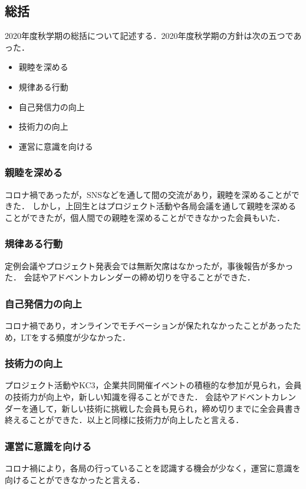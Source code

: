 \subsection*{\firstGrade{}総括}


2020年度秋学期の\firstGrade{}総括について記述する．2020年度秋学期の\firstGrade{}方針は次の五つであった．
\begin{itemize}
	\item 親睦を深める
	\item 規律ある行動
	\item 自己発信力の向上
	\item 技術力の向上
	\item 運営に意識を向ける
\end{itemize}

\subsubsection*{親睦を深める}
コロナ禍であったが，SNSなどを通して\firstGrade{}間の交流があり，親睦を深めることができた．
しかし，上回生とはプロジェクト活動や各局会議を通して親睦を深めることができたが，個人間での親睦を深めることができなかった会員もいた．

\subsubsection*{規律ある行動}
定例会議やプロジェクト発表会では無断欠席はなかったが，事後報告が多かった．
会誌やアドベントカレンダーの締め切りを守ることができた．

\subsubsection*{自己発信力の向上}
コロナ禍であり，オンラインでモチベーションが保たれなかったことがあったため，LTをする頻度が少なかった．

\subsubsection*{技術力の向上}
プロジェクト活動やKC3，企業共同開催イベントの積極的な参加が見られ，\firstGrade{}会員の技術力が向上や，新しい知識を得ることができた．
会誌やアドベントカレンダーを通して，新しい技術に挑戦した会員も見られ，締め切りまでに全会員書き終えることができた．以上と同様に技術力が向上したと言える．

\subsubsection*{運営に意識を向ける}
コロナ禍により，各局の行っていることを認識する機会が少なく，運営に意識を向けることができなかったと言える．



